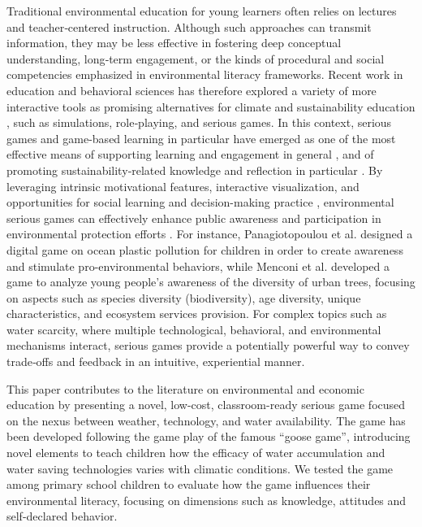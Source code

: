 \documentclass[preprint,12pt]{elsarticle}
\begin{document}
Traditional environmental education for young learners often relies on lectures and teacher‑centered instruction. Although such approaches can transmit information, they may be less effective in fostering deep conceptual understanding, long‑term engagement, or the kinds of procedural and social competencies emphasized in environmental literacy frameworks. Recent work in education and behavioral sciences has therefore explored a variety of more interactive tools as promising alternatives for climate and sustainability education \cite{ardoin2018environmental, hainey2016systematic, stanitsas2019facilitating}, such as simulations, role‑playing, and serious games. In this context, serious games and game-based learning in particular have emerged as one of the most effective means of supporting learning and engagement in general \cite{hainey2016systematic}, and of promoting sustainability‑related knowledge and reflection in particular \cite{stanitsas2019facilitating, madani2017serious}. By leveraging intrinsic motivational features, interactive visualization, and opportunities for social learning and decision-making practice \cite{aubert2018review}, environmental serious games can effectively enhance public awareness and participation in environmental protection efforts \cite{chen2025impact}. For instance, Panagiotopoulou et al. \cite{panagiotopoulou2021design} designed a digital game on ocean plastic pollution for children in order to create awareness and stimulate pro-environmental behaviors, while Menconi et al. \cite{menconi2025nature} developed a game to analyze young people's awareness of the diversity of urban trees, focusing on aspects such as species diversity (biodiversity), age diversity, unique characteristics, and ecosystem services provision.
For complex topics such as water scarcity, where multiple technological, behavioral, and environmental mechanisms interact, serious games provide a potentially powerful way to convey trade‑offs and feedback in an intuitive, experiential manner.

This paper contributes to the literature on environmental and economic education by presenting a novel, low-cost, classroom-ready serious game focused on the nexus between weather, technology, and water availability. The game has been developed following the game play of the famous \enquote{goose game}, introducing novel elements to teach children how the efficacy of water accumulation and water saving technologies varies with climatic conditions. We tested the game among primary school children to evaluate how the game influences their environmental literacy, focusing on dimensions such as knowledge, attitudes and self-declared behavior. 
\end{document}
